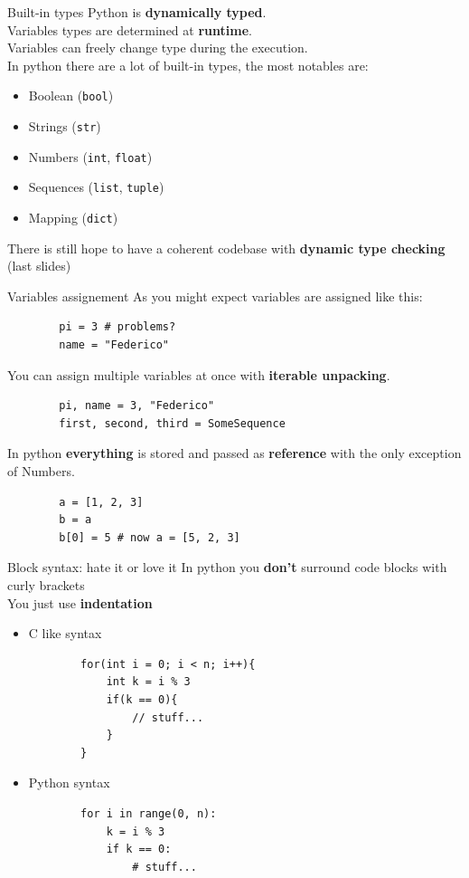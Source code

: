 \documentclass{beamer}
\begin{document}
\begin{frame}[fragile]{Built-in types}
    Python is \textbf{dynamically typed}.\\
    Variables types are determined at \textbf{runtime}.\\
    Variables can freely change type during the execution.\\
    In python there are a lot of built-in types, the most notables are:
    \begin{itemize}
        \item Boolean (\texttt{bool})
        \item Strings (\texttt{str})
        \item Numbers (\texttt{int}, \texttt{float})
        \item Sequences (\texttt{list}, \texttt{tuple})
        \item Mapping (\texttt{dict})
    \end{itemize}
    There is still hope to have a coherent codebase with \textbf{dynamic type checking} (last slides)
\end{frame}

\begin{frame}[fragile]{Variables assignement}
    As you might expect variables are assigned like this:
    \begin{verbatim}
        pi = 3 # problems?
        name = "Federico"
    \end{verbatim}
    You can assign multiple variables at once with \textbf{iterable unpacking}.
    \begin{verbatim}
        pi, name = 3, "Federico"
        first, second, third = SomeSequence
    \end{verbatim}
    In python \textbf{everything} is stored and passed as \textbf{reference} with the only exception of Numbers.
    \begin{verbatim}
        a = [1, 2, 3]
        b = a
        b[0] = 5 # now a = [5, 2, 3]
    \end{verbatim}
\end{frame}

\begin{frame}[fragile]{Block syntax: hate it or love it}
    In python you \textbf{don't} surround code blocks with curly brackets\\
    You just use \textbf{indentation}\\
    \begin{itemize}
        \item C like syntax
        \begin{verbatim}
        for(int i = 0; i < n; i++){
            int k = i % 3
            if(k == 0){
                // stuff...
            }
        }
        \end{verbatim}
        \item Python syntax
        \begin{verbatim}
        for i in range(0, n):
            k = i % 3
            if k == 0:
                # stuff...
        \end{verbatim}
    \end{itemize}
\end{frame}
\end{document}
